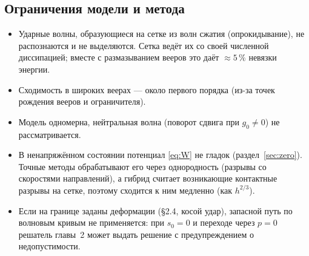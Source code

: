 \documentclass[11pt,a4paper]{article}
\theoremstyle{definition}
\theoremstyle{remark}
\begin{document}
\subsection{Ограничения модели и метода}
\begin{itemize}
\item Ударные волны, образующиеся на сетке из волн сжатия (опрокидывание), не распознаются и не
выделяются. Сетка ведёт их со своей численной диссипацией; вместе с размазыванием вееров это даёт
$\approx5\,\%$ невязки энергии.
\item Сходимость в широких веерах --- около первого порядка (из-за точек рождения вееров и
ограничителя).
\item Модель одномерна, нейтральная волна (поворот сдвига при $g_0\neq0$) не рассматривается.
\item В ненапряжённом состоянии потенциал \eqref{eq:W} не гладок (раздел~\ref{sec:zero}). Точные
методы обрабатывают его через однородность (разрывы со скоростями направлений), а гибрид считает
возникающие контактные разрывы на сетке, поэтому сходится к ним медленно (как $h^{2/3}$).
\item Если на границе заданы деформации (§2.4, косой удар), запасной путь по волновым кривым не
применяется: при $s_0=0$ и переходе через $p=0$ решатель главы~2 может выдать решение с
предупреждением о недопустимости.
\end{itemize}

\appendix
\end{document}

